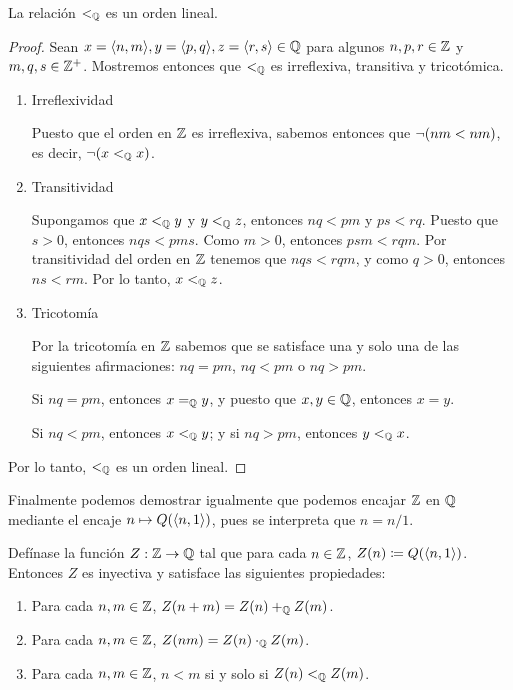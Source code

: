 \begin{theorem}
	La relación $<_{\mathbb{Q}}$ es un orden lineal.
\end{theorem}

\begin{proof}
	Sean $x =\inner*{n, m}, y =\inner*{p, q}, z =\inner*{r, s}\in\QQ$ para algunos $n, p, r\in\mathbb{Z}$ y $m, q, s\in\mathbb{Z}^{+}$. Mostremos entonces que $<_{\mathbb{Q}}$ es irreflexiva, transitiva y tricotómica.

	\begin{enumerate}
		\item Irreflexividad

		Puesto que el orden en $\ZZ$ es irreflexiva, sabemos entonces que $\neg\pa*{nm < nm}$, es decir, $\neg\pa*{x <_{\QQ} x}$.

		\item Transitividad

		Supongamos que $x <_{\mathbb{Q}} y$ y $y <_{\mathbb{Q}} z$, entonces $nq < pm$ y $ps < rq$. Puesto que $s > 0$, entonces $nqs < pms$. Como $m > 0$, entonces $psm < rqm$. Por transitividad del orden en $\ZZ$ tenemos que $nqs < rqm$, y como $q > 0$, entonces $ns < rm$. Por lo tanto, $x <_{\mathbb{Q}} z$.

		\item Tricotomía

		Por la tricotomía en $\ZZ$ sabemos que se satisface una y solo una de las siguientes afirmaciones: $nq = pm$, $nq < pm$ o $nq > pm$.

		Si $nq = pm$, entonces $x =_{\mathbb{Q}} y$, y puesto que $x, y\in\mathbb{Q}$, entonces $x = y$.

		Si $nq < pm$, entonces $x <_{\mathbb{Q}} y$; y si $nq > pm$, entonces $y <_{\mathbb{Q}} x$.
	\end{enumerate}

	Por lo tanto, $<_{\mathbb{Q}}$ es un orden lineal.
\end{proof}

Finalmente podemos demostrar igualmente que podemos encajar $\ZZ$ en $\QQ$ mediante el encaje $n\mapsto Q\pa*{\inner*{n, 1}}$, pues se interpreta que $n = n / 1$.

\begin{theorem}[Encaje de $\ZZ$ en $\QQ$]
	Defínase la función $Z:\mathbb{Z}\to\mathbb{Q}$ tal que para cada $n\in\mathbb{Z}$, $Z\pa*{n}\coloneqq Q\pa*{\inner*{n, 1}}$. Entonces $Z$ es inyectiva y satisface las siguientes propiedades:

	\begin{enumerate}
		\item Para cada $n, m\in\mathbb{Z}$, $Z\pa*{n + m} = Z\pa*{n} +_{\QQ} Z\pa*{m}$.
		\item Para cada $n, m\in\mathbb{Z}$, $Z\pa*{nm} = Z\pa*{n}\cdot_{\QQ} Z\pa*{m}$.
		\item Para cada $n, m\in\mathbb{Z}$, $n < m$ si y solo si $Z\pa*{n} <_{\QQ} Z\pa*{m}$.
	\end{enumerate}
\end{theorem}


